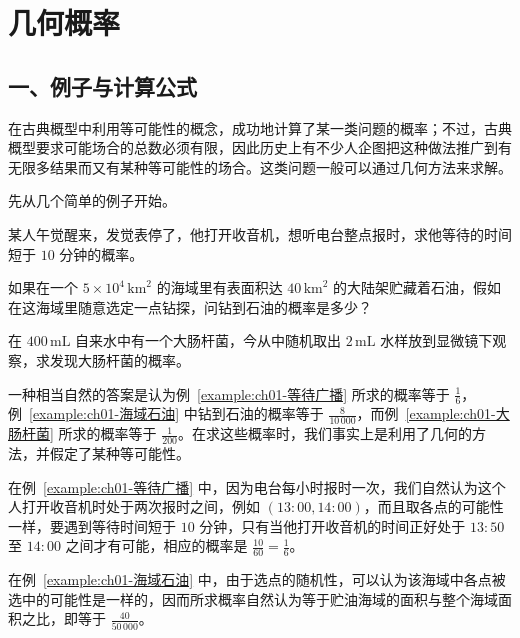 \documentclass[../../main.tex]{subfiles}
\begin{document}
\section{几何概率}\label{section:ch01-几何概率}

\subsection*{一、例子与计算公式}

在古典概型中利用等可能性的概念，成功地计算了某一类问题的概率；不过，古典概型要求可能场合的总数必须有限，因此历史上有不少人企图把这种做法推广到有无限多结果而又有某种等可能性的场合。这类问题一般可以通过几何方法来求解。

先从几个简单的例子开始。

\begin{example}[等待广播]\label{example:ch01-等待广播}
某人午觉醒来，发觉表停了，他打开收音机，想听电台整点报时，求他等待的时间短于 $10$ 分钟的概率。
\end{example}

\begin{example}[海域石油]\label{example:ch01-海域石油}
如果在一个 $5\times 10^4\,\mathrm{km}^2$ 的海域里有表面积达 $40\,\mathrm{km}^2$ 的大陆架贮藏着石油，假如在这海域里随意选定一点钻探，问钻到石油的概率是多少？
\end{example}

\begin{example}[大肠杆菌]\label{example:ch01-大肠杆菌}
在 $400\,\mathrm{mL}$ 自来水中有一个大肠杆菌，今从中随机取出 $2\,\mathrm{mL}$ 水样放到显微镜下观察，求发现大肠杆菌的概率。
\end{example}

一种相当自然的答案是认为例~\ref{example:ch01-等待广播} 所求的概率等于 $\frac{1}{6}$，例~\ref{example:ch01-海域石油} 中钻到石油的概率等于 $\frac{8}{10\,000}$，而例~\ref{example:ch01-大肠杆菌} 所求的概率等于 $\frac{1}{200}$。在求这些概率时，我们事实上是利用了几何的方法，并假定了某种等可能性。

在例~\ref{example:ch01-等待广播} 中，因为电台每小时报时一次，我们自然认为这个人打开收音机时处于两次报时之间，例如 $(13:00,14:00)$，而且取各点的可能性一样，要遇到等待时间短于 $10$ 分钟，只有当他打开收音机的时间正好处于 $13:50$ 至 $14:00$ 之间才有可能，相应的概率是 $\frac{10}{60}=\frac{1}{6}$。

在例~\ref{example:ch01-海域石油} 中，由于选点的随机性，可以认为该海域中各点被选中的可能性是一样的，因而所求概率自然认为等于贮油海域的面积与整个海域面积之比，即等于 $\frac{40}{50\,000}$。
\end{document}
